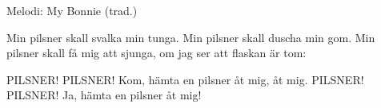\begin{song}

\begin{songmeta}
Melodi: My Bonnie (trad.)
\end{songmeta}

\begin{songtext}
Min pilsner skall svalka min tunga.
Min pilsner skall duscha min gom.
Min pilsner skall få mig att sjunga,
om jag ser att flaskan är tom:

PILSNER! PILSNER!
Kom, hämta en pilsner åt mig, åt mig.
PILSNER! PILSNER!
Ja, hämta en pilsner åt mig!
\end{songtext}
\end{song}
